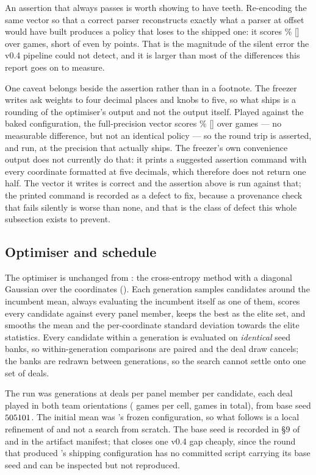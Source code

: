 An assertion that always passes is worth showing to have teeth. Re-encoding the
same vector so that a correct parser reconstructs exactly what a parser at offset
\numAliasOffset{} would have built produces a policy that loses to the shipped
one: it scores \numAliasWin\% [\numAliasCI] over \numAliasGames{} games, short of
even by \numAliasLoss{} points. That is the magnitude of the silent error the
v0.4 pipeline could not detect, and it is larger than most of the differences
this report goes on to measure.

One caveat belongs beside the assertion rather than in a footnote. The freezer
writes ask weights to four decimal places and knobs to five, so what ships is a
rounding of the optimiser's output and not the output itself. Played against the
baked configuration, the full-precision vector scores \numQuantWin\%
[\numQuantCI] over \numQuantGames{} games --- no measurable difference, but not
an identical policy --- so the round trip is asserted, and run, at the precision
that actually ships. The freezer's own convenience output does not currently do
that: it prints a suggested assertion command with every coordinate formatted at
five decimals, which therefore does not return one half. The vector it writes is
correct and the assertion above is run against that; the printed command is
recorded as a defect to fix, because a provenance check that fails silently is
worse than none, and that is the class of defect this whole subsection exists to
prevent.

\subsection{Optimiser and schedule}
\label{sec:fit-cem}

The optimiser is unchanged from \vfour{}: the cross-entropy method with a
diagonal Gaussian over the \numFitDims{} coordinates
(). Each generation samples \numFitPop{}
candidates around the incumbent mean, always evaluating the incumbent itself as
one of them, scores every candidate against every panel member, keeps the
\numFitElite{} best as the elite set, and smooths the mean and the
per-coordinate standard deviation towards the elite statistics. Every candidate
within a generation is evaluated on \emph{identical} seed banks, so
within-generation comparisons are paired and the deal draw cancels; the banks are
redrawn between generations, so the search cannot settle onto one set of deals.

The run was \numFitGens{} generations at \numFitDeals{} deals per panel member
per candidate, each deal played in both team orientations
(\numFitCellGames{} games per cell, \numFitTotalGames{} games in total), from
base seed $505101$. The initial mean was \vfour{}'s frozen configuration, so
what follows is a local refinement of \vfour{} and not a search from scratch.
The base seed is recorded in \S9 of  and in the
artifact manifest; that closes one v0.4 gap cheaply, since the round that
produced \vfour{}'s shipping configuration has no committed script carrying its
base seed and can be inspected but not reproduced.

